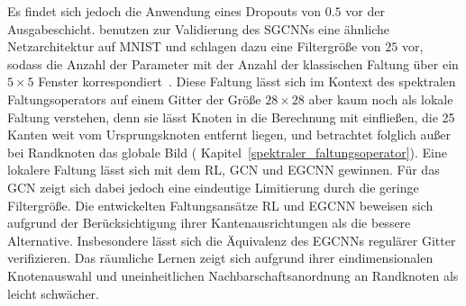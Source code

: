 Es findet sich jedoch die Anwendung eines Dropouts von $0.5$ vor der Ausgabeschicht.
\citeauthor{Defferrard} benutzen zur Validierung des \acs{SGCNN}s eine ähnliche Netzarchitektur auf \gls{MNIST} und schlagen dazu eine Filtergröße von $25$ vor, sodass die Anzahl der Parameter mit der Anzahl der klassischen Faltung über ein $5 \times 5$ Fenster korrespondiert~\cite{Defferrard}.
Diese Faltung lässt sich im Kontext des spektralen Faltungsoperators auf einem Gitter der Größe $28 \times 28$ aber kaum noch als lokale Faltung verstehen, denn sie lässt Knoten in die Berechnung mit einfließen, die 25 Kanten weit vom Ursprungsknoten entfernt liegen, und betrachtet folglich außer bei Randknoten das globale Bild (\vgl{} Kapitel~\ref{spektraler_faltungsoperator}).
Eine lokalere Faltung lässt sich mit dem \acs{RL}, \acs{GCN} und \acs{EGCNN} gewinnen.
Für das \acs{GCN} zeigt sich dabei jedoch eine eindeutige Limitierung durch die geringe Filtergröße.
Die entwickelten Faltungsansätze \acs{RL} und \acs{EGCNN} beweisen sich aufgrund der Berücksichtigung ihrer Kantenausrichtungen als die bessere Alternative.
Insbesondere lässt sich die Äquivalenz des \acs{EGCNN}s \bzgl{} regulärer Gitter verifizieren.
Das räumliche Lernen zeigt sich aufgrund ihrer eindimensionalen Knotenauswahl und uneinheitlichen Nachbarschaftsanordnung an Randknoten als leicht schwächer.

